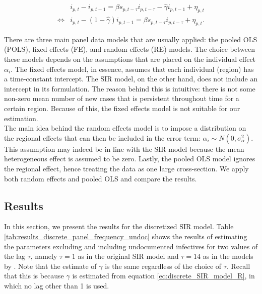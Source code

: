 \documentclass[12pt]{article}
\begin{document}
\begin{appendices}
    	    \begin{equation} \label{eq:discrete_SIR_model_I_twostep}
    	        \begin{split}
            		& i_{p,t} - i_{p,t-1} = \beta s_{p,t-\tau}i_{p,t-\tau} - \hat{\gamma} i_{p,t-1} + \eta_{p,t} \\
        	        \iff & i_{p,t} - \left(1 - \hat{\gamma}\right) i_{p,t-1} = \beta s_{p,t-\tau}i_{p,t-\tau} + \eta_{p,t}.
        		\end{split}
    	    \end{equation}
	
	    There are three main panel data models that are usually applied: the pooled OLS (POLS), fixed effects (FE), and random effects (RE) models. The choice between these models depends on the assumptions that are placed on the individual effect $\alpha_i$. The fixed effects model, in essence, assumes that each individual (region) has a time-constant intercept. The SIR model, on the other hand, does not include an intercept in its formulation. The reason behind this is intuitive: there is not some non-zero mean number of new cases that is persistent throughout time for a certain region. Because of this, the fixed effects model is not suitable for our estimation.
	    \\
    	
    	\newpage
    	The main idea behind the random effects model is to impose a distribution on the regional effects that can then be included in the error term: $\alpha_i \sim N\left(0, \sigma^2_{\alpha}\right)$. This assumption may indeed be in line with the SIR model because the mean heterogeneous effect is assumed to be zero. Lastly, the pooled OLS model ignores the regional effect, hence treating the data as one large cross-section. We apply both random effects and pooled OLS and compare the results.
	
	    \subsection{Results} \label{sapp:discrete_sir_results}
		In this section, we present the results for the discretized SIR model. Table \ref{tab:results_discrete_panel_frequency_undoc} shows the results of estimating the parameters excluding and including undocumented infectives for two values of the lag $\tau$, namely $\tau = 1$ as in the original SIR model and $\tau = 14$ as in the models by \textcite{adda2016economic}. Note that the estimate of $\gamma$ is the same regardless of the choice of $\tau$. Recall that this is because $\gamma$ is estimated from equation \eqref{eq:discrete_SIR_model_R}, in which no lag other than 1 is used.
	

\end{appendices}
\end{document}
